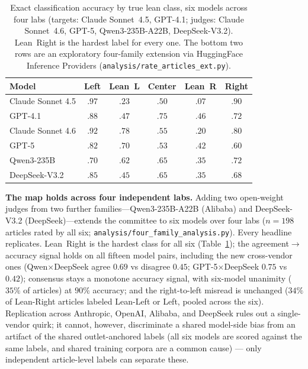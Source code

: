 \documentclass{article}
\begin{document}
\begin{table}[t]\centering\small
\begin{tabular}{lccccc}
\toprule
Model & Left & Lean~L & Center & \textbf{Lean~R} & Right \\
\midrule
Claude Sonnet 4.5 & $.97$ & $.23$ & $.50$ & $\mathbf{.07}$ & $.90$ \\
GPT-4.1 & $.88$ & $.47$ & $.75$ & $\mathbf{.46}$ & $.72$ \\
Claude Sonnet 4.6 & $.92$ & $.78$ & $.55$ & $\mathbf{.20}$ & $.80$ \\
GPT-5 & $.82$ & $.70$ & $.53$ & $\mathbf{.42}$ & $.60$ \\
Qwen3-235B & $.70$ & $.62$ & $.65$ & $\mathbf{.35}$ & $.72$ \\
DeepSeek-V3.2 & $.85$ & $.45$ & $.65$ & $\mathbf{.35}$ & $.68$ \\
\bottomrule
\end{tabular}
\caption{Exact classification accuracy by true lean class, six models
across four labs (targets: Claude Sonnet~4.5, GPT-4.1; judges: Claude
Sonnet~4.6, GPT-5, Qwen3-235B-A22B, DeepSeek-V3.2). Lean~Right is the
hardest label for every one. The bottom two rows are an exploratory
four-family extension via HuggingFace Inference Providers
(\texttt{analysis/rate\_articles\_ext.py}).}
\label{tab:byclass}
\end{table}

\textbf{The map holds across four independent labs.} Adding two
open-weight judges from two further families---Qwen3-235B-A22B (Alibaba)
and DeepSeek-V3.2 (DeepSeek)---extends the committee to six models over
four labs ($n{=}198$ articles rated by all six;
\texttt{analysis/four\_family\_analysis.py}). Every headline replicates.
Lean~Right is the hardest class for all six (Table~\ref{tab:byclass});
the agreement$\to$accuracy signal holds on all fifteen model pairs,
including the new cross-vendor ones (Qwen$\times$DeepSeek agree $0.69$ vs
disagree $0.45$; GPT-5$\times$DeepSeek $0.75$ vs $0.42$); consensus stays
a monotone accuracy signal, with six-model unanimity ($35\%$ of articles)
at $90\%$ accuracy; and the right-to-left misread is unchanged ($34\%$ of
Lean-Right articles labeled Lean-Left or Left, pooled across the six).
Replication across Anthropic, OpenAI, Alibaba, and DeepSeek rules out a
single-vendor quirk; it cannot, however, discriminate a shared
model-side bias from an artifact of the shared outlet-anchored labels
(all six models are scored against the same labels, and shared training
corpora are a common cause) --- only independent article-level labels
can separate these.
\end{document}
